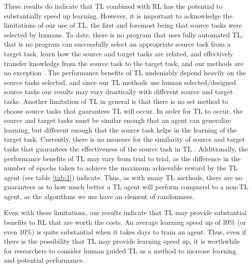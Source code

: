\documentclass{llncs}
\begin{document}
These results do indicate that TL combined with RL has the potential to substantially speed up learning. 
However, it is important to acknowledge the limitations of our use of TL, the first and foremost being that source tasks were selected by humans. 
To date, there is no program that uses fully automated TL, that is no program can successfully select an appropriate source task from a target task, learn how the source and target tasks are related, and effectively transfer knowledge from the source task to the target task, and our methods are no exception \citep{taylor2009transfer}. 
The performance benefits of TL undeniably depend heavily on the source tasks selected, and since our TL methods use human selected/designed source tasks our results may vary drastically with different source and target tasks. 
Another limitation of TL in general is that there is no set method to choose source tasks that guarantees TL will occur.
In order for TL to occur, the source and target tasks must be similar enough that an agent can generalize learning, but different enough that the source task helps in the learning of the target task.
Currently, there is no measure for the similarity of source and target tasks that guarantees the effectiveness of the source task in TL \citep{taylor2009transfer}.
Additionally, the performance benefits of TL may vary from trial to trial, as the difference in the number of epochs taken to achieve the maximum achievable reward by the TL agent (see table \ref{tab:1}) indicate. 
Thus, as with many TL methods, there are no guarantees as to how much better a TL agent will perform compared to a non-TL agent, as the algorithms we use have an element of randomness. 

Even with these limitations, our results indicate that TL may provide substantial benefits to RL that are worth the costs.
An average learning speed up of 39\% (or even 10\%) is quite substantial when it takes days to train an agent. 
Thus, even if there is the possibility that TL may provide learning speed up, it is worthwhile for researchers to consider human guided TL as a method to increase learning and potential performance. 


\end{document}
